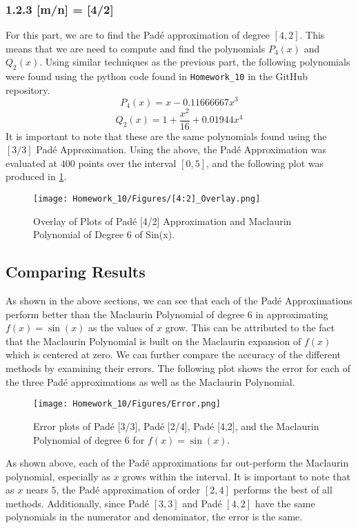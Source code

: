 \documentclass{article}
\begin{document}
\subsubsection*{1.2.3 [m/n] = [4/2]}
For this part, we are to find the Pad\'e approximation of degree \([4,2]\). This means that we are need to compute and find the polynomials \(P_4(x)\) and \(Q_2(x)\). Using similar techniques as the previous part, the following polynomials were found using the python code found in \texttt{Homework\_10} in the GitHub repository.
\[
P_4(x) = x - 0.11666667x^3
\]
\[
Q_2(x) = 1 + \frac{x^2}{16} + 0.01944x^4
\]
It is important to note that these are the same polynomials found using the \([3/3]\) Pad\'e Approximation. Using the above, the Pad\'e Approximation was evaluated at \(400\) points over the interval \([0,5]\), and the following plot was produced in \ref{fig:[4/2]_Overlay}.
\begin{figure}[h!]
    \centering
    \texttt{[image: Homework\_10/Figures/[4:2]\_Overlay.png]}
    \caption{Overlay of Plots of Pad\'e [4/2] Approximation and Maclaurin Polynomial of Degree 6 of Sin(x).}
    \label{fig:[4/2]_Overlay}
\end{figure}

\subsection{Comparing Results}
As shown in the above sections, we can see that each of the Pad\'e Approximations perform better than the Maclaurin Polynomial of degree 6 in approximating \(f(x)=\sin{(x)}\) as the values of \(x\) grow. This can be attributed to the fact that the Maclaurin Polynomial is built on the Maclaurin expansion of \(f(x)\) which is centered at zero. We can further compare the accuracy of the different methods by examining their errors. The following plot shows the error for each of the three Pad\'e approximations as well as the Maclaurin Polynomial.
\begin{figure}[h!]
    \centering
    \texttt{[image: Homework\_10/Figures/Error.png]}
    \caption{Error plots of Pad\'e [3/3], Pad\'e [2/4], Pad\'e [4,2], and the Maclaurin Polynomial of degree 6 for \(f(x) = \sin{(x)}.\)}
    \label{fig:All_Error}
\end{figure}
As shown above, each of the Pad\'e approximations far out-perform the Maclaurin polynomial, especially as \(x\) grows within the interval. It is important to note that as \(x\) nears \(5\), the Pad\'e approximation of order \([2,4]\) performs the best of all methods. Additionally, since Pad\'e \([3,3]\) and Pad\'e \([4,2]\) have the same polynomials in the numerator and denominator, the error is the same.
\end{document}
